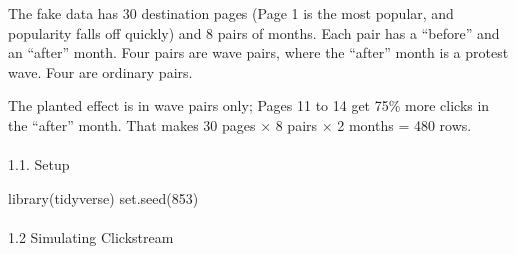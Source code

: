 \documentclass[
  9pt,
  letterpaper,
  DIV=11,
  numbers=noendperiod]{scrartcl}
\makeatletter
\let\oldparagraph\paragraph
\renewcommand{\paragraph}{
    \@ifstar
      \xxxParagraphStar
      \xxxParagraphNoStar
  }
\newcommand{\xxxParagraphStar}[1]{\oldparagraph*{#1}\mbox{}}
\newcommand{\xxxParagraphNoStar}[1]{\oldparagraph{#1}\mbox{}}
\newenvironment{Shaded}{\begin{snugshade}}{\end{snugshade}}
\newcommand{\DecValTok}[1]{\textcolor[rgb]{0.68,0.00,0.00}{#1}}
\newcommand{\FunctionTok}[1]{\textcolor[rgb]{0.28,0.35,0.67}{#1}}
\newcommand{\NormalTok}[1]{\textcolor[rgb]{0.00,0.23,0.31}{#1}}
\makeatother
\begin{document}
The fake data has 30 destination pages (Page 1 is the most popular, and
popularity falls off quickly) and 8 pairs of months. Each pair has a
``before'' and an ``after'' month. Four pairs are wave pairs, where the
``after'' month is a protest wave. Four are ordinary pairs.

The planted effect is in wave pairs only; Pages 11 to 14 get 75\% more
clicks in the ``after'' month. That makes 30 pages × 8 pairs × 2 months
= 480 rows.

\paragraph{1.1. Setup}\label{setup}

\begin{Shaded}
\begin{Highlighting}[]
\FunctionTok{library}\NormalTok{(tidyverse)}
\FunctionTok{set.seed}\NormalTok{(}\DecValTok{853}\NormalTok{)}
\end{Highlighting}
\end{Shaded}

\paragraph{1.2 Simulating Clickstream}\label{simulating-clickstream}
\end{document}
